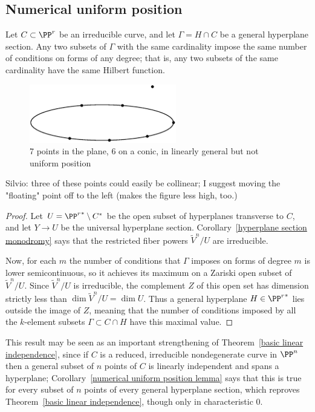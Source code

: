 \subsection{Numerical uniform position}
\begin{corollary}\label{numerical uniform position lemma}
Let $C\subset \PP^r$ be an irreducible curve, and let $\Gamma = H\cap C$ be a general hyperplane section. Any two subsets of $\Gamma$ with the same cardinality impose the same number of conditions on forms of any degree; that is, any two subsets of the same cardinality have the same Hilbert function.
\end{corollary}


\begin{figure}
\centerline {\includegraphics[height=1in]{"main/Fig10-2"}}
\caption{7 points in the plane, 6 on a conic, in linearly general but not uniform position}
\label{default}
\end{figure}
{Silvio: three of these points could easily be collinear; I suggest moving the "floating" point off to the left (makes the figure less high, too.)}

\begin{proof} Let $U = {\PP^r}^* \setminus C^*$ be the open subset of hyperplanes transverse to $C$, and let $Y\to U$ be the universal hyperplane section.
Corollary~\ref{hyperplane section monodromy} says that the restricted fiber powers $\tilde V^n/U$ are irreducible.

Now, for each $m$ the number of conditions that $\Gamma$ imposes on forms of degree $m$ is lower semicontinuous, so it achieves its maximum on a Zariski open subset of $\tilde V^n/U$. Since $\tilde V^n/U$ is irreducible, the complement $Z$ of this open set has dimension strictly less than $\dim \tilde V^n/U = \dim U$. Thus a general hyperplane $H \in {\PP^r}^*$  lies outside the image of $Z$, meaning that the number of conditions imposed by all the $k$-element subsets $\Gamma \subset C \cap H$ have this maximal value.
\end{proof}

This result may be seen as an important strengthening of Theorem~\ref{basic linear independence}, since if $C$ is a reduced, irreducible nondegenerate curve in $\PP^n$ then a general subset of $n$ points of $C$ is linearly independent and spans a hyperplane; Corollary~\ref{numerical uniform position lemma} says that this is true for every subset of $n$ points of every general hyperplane section, 
which reproves Theorem~\ref{basic linear independence}, though only in characteristic 0. 

